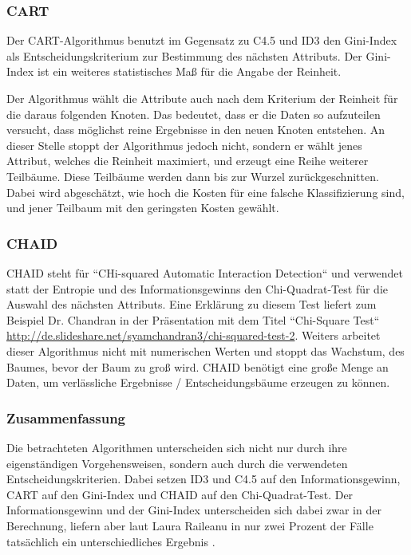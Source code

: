 \subsubsection{CART}
Der CART-Algorithmus benutzt im Gegensatz zu C4.5 und ID3 den Gini-Index als Entscheidungskriterium zur Bestimmung des nächsten Attributs. \cite{rapidminer_rapidminer_2015} Der Gini-Index ist ein weiteres statistisches Maß für die Angabe der Reinheit. 

Der Algorithmus wählt die Attribute auch nach dem Kriterium der Reinheit für die daraus folgenden Knoten. Das bedeutet, dass er die Daten so aufzuteilen versucht, dass möglichst reine Ergebnisse in den neuen Knoten entstehen. An dieser Stelle stoppt der Algorithmus jedoch nicht, sondern er wählt jenes Attribut, welches die Reinheit maximiert, und erzeugt  eine Reihe weiterer Teilbäume. Diese Teilbäume werden dann bis zur Wurzel zurückgeschnitten. Dabei wird abgeschätzt, wie hoch die Kosten für eine falsche Klassifizierung sind, und jener Teilbaum mit den geringsten Kosten gewählt. \cite{wei-yin_loh_classification_2008}

\subsubsection{CHAID}
CHAID steht für ``CHi-squared Automatic Interaction Detection`` und verwendet statt der Entropie und des Informationsgewinns den Chi-Quadrat-Test für die Auswahl des nächsten Attributs. Eine Erklärung zu diesem Test liefert zum Beispiel Dr. Chandran in der Präsentation mit dem Titel ``Chi-Square Test``  \url{http://de.slideshare.net/syamchandran3/chi-squared-test-2}.
Weiters arbeitet dieser Algorithmus nicht mit numerischen Werten und stoppt das Wachstum, des Baumes, bevor der Baum zu groß wird. CHAID benötigt eine große Menge an Daten, um verlässliche Ergebnisse / Entscheidungsbäume erzeugen zu können.\cite{rapidminer_rapidminer_2015}

\subsubsection{Zusammenfassung}
Die betrachteten Algorithmen unterscheiden sich nicht nur durch ihre eigenständigen Vorgehensweisen, sondern auch durch die verwendeten Entscheidungskriterien. Dabei setzen ID3 und C4.5 auf den Informationsgewinn, CART auf den Gini-Index und CHAID auf den Chi-Quadrat-Test. Der Informationsgewinn und der Gini-Index unterscheiden sich dabei zwar in der Berechnung, liefern aber laut Laura Raileanu in nur zwei Prozent der Fälle tatsächlich ein unterschiedliches Ergebnis \cite{laura_raileanu_2004}. 

